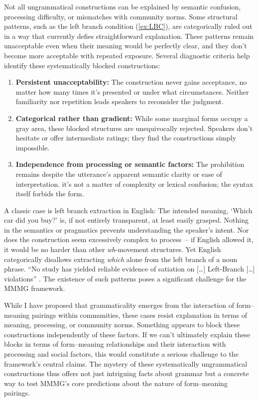 Not all ungrammatical constructions can be explained by semantic confusion, processing difficulty, or mismatches with community norms. Some structural patterns, such as the left branch condition (\ref{ex:LBC}), are categorically ruled out in a way that currently defies straightforward explanation. These patterns remain unacceptable even when their meaning would be perfectly clear, and they don't become more acceptable with repeated exposure.
Several diagnostic criteria help identify these systematically blocked constructions:
\begin{enumerate}
\item \textbf{Persistent unacceptability:} The construction never gains acceptance, no matter how many times it's presented or under what circumstances. Neither familiarity nor repetition leads speakers to reconsider the judgment.
\item \textbf{Categorical rather than gradient:} While some marginal forms occupy a gray area, these blocked structures are unequivocally rejected. Speakers don't hesitate or offer intermediate ratings; they find the constructions simply impossible.
\item \textbf{Independence from processing or semantic factors:} The prohibition remains despite the utterance's apparent semantic clarity or ease of interpretation. it's not a matter of complexity or lexical confusion; the syntax itself forbids the form.
\end{enumerate}
A classic case is left branch extraction in English:
\label{ex:LBC}
\z
The intended meaning, `Which car did you buy?' is, if not entirely transparent, at least easily grasped. Nothing in the semantics or pragmatics prevents understanding the speaker's intent. Nor does the construction seem excessively complex to process~-- if English allowed it, it would be no harder than other \textit{wh}-movement structures. Yet English categorically disallows extracting \textit{which} alone from the left branch of a noun phrase. ``No study has yielded reliable evidence of satiation on [\dots] Left-Branch [\dots] violations'' \autocite[22]{Snyder2022}.
The existence of such patterns poses a significant challenge for the MMMG framework.

While I have proposed that grammaticality emerges from the interaction of form--meaning pairings within communities, these cases resist explanation in terms of meaning, processing, or community norms. Something appears to block these constructions independently of these factors. If we can't ultimately explain these blocks in terms of form--meaning relationships and their interaction with processing and social factors, this would constitute a serious challenge to the framework's central claims. The mystery of these systematically ungrammatical constructions thus offers not just intriguing facts about grammar but a concrete way to test MMMG's core predictions about the nature of form--meaning pairings.


